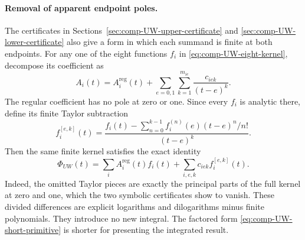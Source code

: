 \paragraph{Removal of apparent endpoint poles.} The certificates in
Sections~\ref{sec:comp-UW-upper-certificate} and
\ref{sec:comp-UW-lower-certificate} also give a form in which each
summand is finite at both endpoints. For any one of the eight functions
$f_i$ in \eqref{eq:comp-UW-eight-kernel}, decompose its coefficient as
\begin{equation}
 A_i(t)=A_i^{\mathrm{reg}}(t)
       +\sum_{e=0,1}\sum_{k=1}^{m_{ie}}\frac{c_{iek}}{(t-e)^k}.
\end{equation}
The regular coefficient has no pole at zero or one. Since every $f_i$
is analytic there, define its finite Taylor subtraction
\begin{equation}
 f_i^{[e,k]}(t)=\frac{f_i(t)-\displaystyle\sum_{n=0}^{k-1}
                  f_i^{(n)}(e)(t-e)^n/n!}{(t-e)^k}.
\end{equation}
Then the same finite kernel satisfies the exact identity
\begin{equation}
 \Phi_{UW}(t)=\sum_i A_i^{\mathrm{reg}}(t)f_i(t)
          +\sum_{i,e,k}c_{iek}f_i^{[e,k]}(t).
\end{equation}
Indeed, the omitted Taylor pieces are exactly the principal parts
of the full kernel at zero and one, which the two symbolic certificates
show to vanish. These divided differences are explicit logarithms and
dilogarithms minus finite polynomials. They introduce no new integral.
The factored form \eqref{eq:comp-UW-short-primitive} is shorter for
presenting the integrated result.
